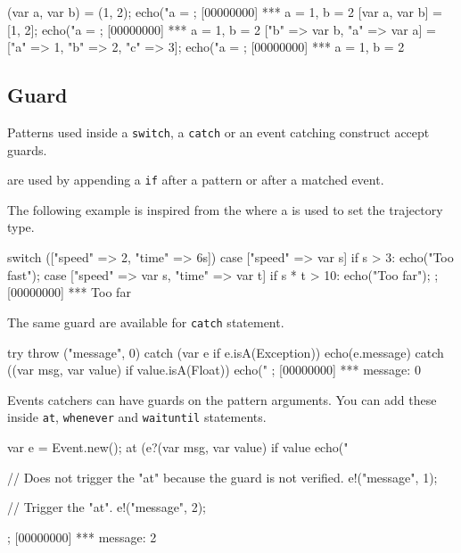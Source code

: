 \begin{urbiscript}
{
  (var a, var b) = (1, 2);
  echo("a = %
};
[00000000] *** a = 1, b = 2
{
  [var a, var b] = [1, 2];
  echo("a = %
};
[00000000] *** a = 1, b = 2
{
  ["b" => var b, "a" => var a] = ["a" => 1, "b" => 2, "c" => 3];
  echo("a = %
};
[00000000] *** a = 1, b = 2
\end{urbiscript}

\subsection{Guard}

Patterns used inside a \lstinline{switch}, a \lstinline{catch} or an event
catching construct accept guards.

 are used by appending a \lstinline{if} after a pattern or
after a matched event.

The following example is inspired from the 
where a  is used to set the trajectory type.

\begin{urbiscript}
switch (["speed" => 2, "time" => 6s])
{
  case ["speed" => var s] if s > 3:
    echo("Too fast");
  case ["speed" => var s, "time" => var t] if s * t > 10:
    echo("Too far");
};
[00000000] *** Too far
\end{urbiscript}

The same guard are available for \lstinline{catch} statement.

\begin{urbiscript}
try
{
  throw ("message", 0)
}
catch (var e if e.isA(Exception))
{
  echo(e.message)
}
catch ((var msg, var value) if value.isA(Float))
{
  echo("%
};
[00000000] *** message: 0
\end{urbiscript}

Events catchers can have guards on the pattern arguments.  You can add these
inside \lstinline{at}, \lstinline{whenever} and \lstinline{waituntil}
statements.

\begin{urbiscript}
{
  var e = Event.new();
  at (e?(var msg, var value) if value %
    echo("%

  // Does not trigger the "at" because the guard is not verified.
  e!("message", 1);

  // Trigger the "at".
  e!("message", 2);
};
[00000000] *** message: 2
\end{urbiscript}

